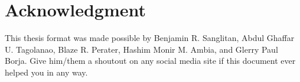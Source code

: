 \chapter*{Acknowledgment}
This thesis format was made possible by Benjamin R. Sanglitan, Abdul Ghaffar U. Tagolanao, Blaze R. Perater, Hashim Monir M. Ambia, and Glerry Paul Borja. Give him/them a shoutout on any social media site if this document ever helped you in any way.